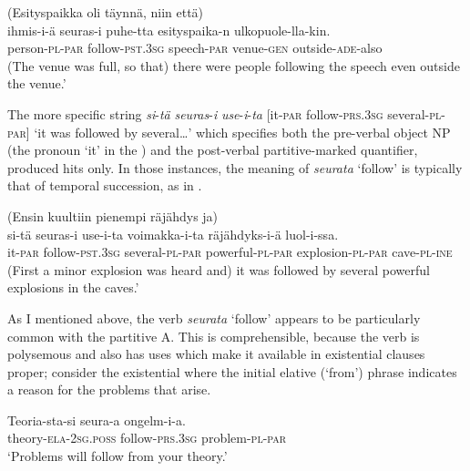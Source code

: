 \documentclass[output=paper]{LSP/langsci}
\begin{document}
\ea (Esityspaikka oli täynnä, niin että)\label{15-hu-ex:12}\\
\gll ihmis-i-ä seuras-i puhe-tta esityspaika-n ulkopuole-lla-kin.\\
person-\textsc{pl}-\textsc{par} follow-\textsc{pst}.\textsc{3sg} speech-\textsc{par} venue-\textsc{gen} outside-\textsc{ade}-also\\
\glt (The venue was full, so that) there were people following the speech even outside the venue.’ %
\z

The more specific string \textit{si}-\textit{tä} \textit{seuras}-\textit{i} \textit{use}-\textit{i}-\textit{ta} [it-\textsc{par} follow-\textsc{prs}.\textsc{3sg} several-\textsc{pl}-\textsc{par}] ‘it was followed by several…’ which specifies both the pre-verbal object NP (the pronoun ‘it’ in the ) and the post-verbal partitive-marked quantifier, produced  hits only. In those instances, the meaning of \textit{seurata} ‘follow’ is typically that of temporal succession, as in . 

\ea\label{15-hu-ex:13}
(Ensin kuultiin pienempi räjähdys ja)\\
\gll si-tä seuras-i use-i-ta voimakka-i-ta räjähdyks-i-ä luol-i-ssa.\\
it-\textsc{par} follow-\textsc{pst}.\textsc{3sg} several-\textsc{pl}-\textsc{par} powerful-\textsc{pl}-\textsc{par} explosion-\textsc{pl}-\textsc{par} cave-\textsc{pl}-\textsc{ine}\\
\glt (First a minor explosion was heard and) it was followed by several powerful explosions in the caves.’ %
\z

As I mentioned above, the verb \textit{seurata} ‘follow’ appears to be particularly common with the partitive A. This is comprehensible, because the verb is polysemous and also has  uses which make it available in existential clauses proper; consider the existential  where the initial elative (‘from’) phrase indicates a reason for the problems that arise. 

\ea%
\label{15-hu-ex:14}

\gll Teoria-sta-si seura-a ongelm-i-a.\\
theory-\textsc{ela}-\textsc{2sg}.\textsc{poss} follow-\textsc{prs}.\textsc{3sg} problem-\textsc{pl}-\textsc{par}\\
\glt `Problems will follow from your theory.’ 
\z
\end{document}
